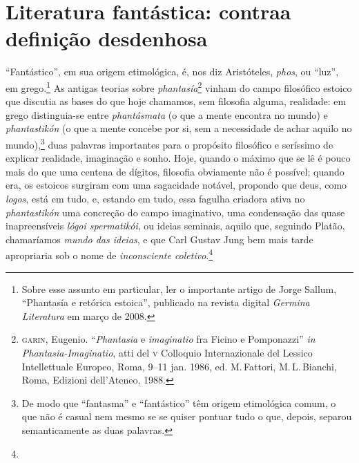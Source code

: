 \section{Literatura fantástica: contra\break a definição desdenhosa}

``Fantástico'', em sua origem etimológica, é, nos diz Aristóteles,
\emph{phos}, ou ``luz'', em grego.\footnote{Sobre esse assunto em
  particular, ler o importante artigo de Jorge Sallum, ``Phantasía e
  retórica estoica'', publicado na revista digital \emph{Germina
  Literatura} em março de 2008.} As antigas teorias sobre
\emph{phantasía}\footnote{\textsc{garin}, Eugenio. ``\emph{Phantasia} e
  \emph{imaginatio} fra Ficino e Pomponazzi'' \emph{in}
  \emph{Phantasia-Imaginatio}, atti del \textsc{v} Colloquio Internazionale del
  Lessico Intellettuale Europeo, Roma, 9--11 jan. 1986, ed. M.\,Fattori, 
  M.\,L.\,Bianchi, Roma, Edizioni dell'Ateneo, 1988.} vinham do
campo filosófico estoico que discutia as bases do que hoje chamamos, sem
filosofia alguma, realidade: em grego distinguia-se entre
\emph{phantásmata} (o que a mente encontra no mundo) e
\emph{phantastikón} (o que a mente concebe por si, sem a necessidade de
achar aquilo no mundo),\footnote{De modo que ``fantasma'' e
  ``fantástico'' têm origem etimológica comum, o que não é casual nem
  mesmo se se quiser pontuar tudo o que, depois, separou semanticamente
  as duas palavras.} duas palavras importantes para o propósito
filosófico e seríssimo de explicar realidade, imaginação e sonho. Hoje,
quando o máximo que se lê é pouco mais do que uma centena de dígitos,
filosofia obviamente não é possível; quando era, os estoicos surgiram
com uma sagacidade notável, propondo que deus, como \emph{logos}, está
em tudo, e, estando em tudo, essa fagulha criadora ativa no
\emph{phantastikón} uma concreção do campo imaginativo, uma condensação
das quase inapreensíveis \emph{lógoi spermatikói}, ou ideias seminais,
aquilo que, seguindo Platão, chamaríamos \emph{mundo das ideias}, e
que Carl Gustav Jung bem mais tarde apropriaria sob o nome de
\emph{inconsciente coletivo}.\footnote{}

